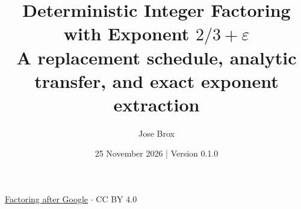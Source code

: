 
\title{Deterministic Integer Factoring with Exponent $2/3+\varepsilon$\\[0.4em]\large A replacement schedule, analytic transfer, and exact exponent extraction}
\renewcommand{\paperrunningtitle}{Deterministic integer factoring}
\author{Jose Brox}
\date{25 November 2026 \quad | \quad Version 0.1.0}

\maketitle
\begin{center}\small\href{https://github.com/JoseBrox/Factoring_after_Google}{Factoring after Google} $\cdot$ CC BY 4.0\end{center}

\clearpage



